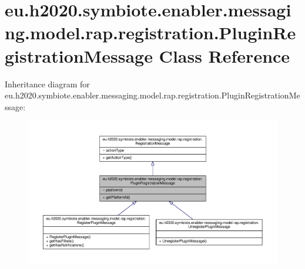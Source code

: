 \hypertarget{classeu_1_1h2020_1_1symbiote_1_1enabler_1_1messaging_1_1model_1_1rap_1_1registration_1_1PluginRegistrationMessage}{}\section{eu.\+h2020.\+symbiote.\+enabler.\+messaging.\+model.\+rap.\+registration.\+Plugin\+Registration\+Message Class Reference}
\label{classeu_1_1h2020_1_1symbiote_1_1enabler_1_1messaging_1_1model_1_1rap_1_1registration_1_1PluginRegistrationMessage}


Inheritance diagram for eu.\+h2020.\+symbiote.\+enabler.\+messaging.\+model.\+rap.\+registration.\+Plugin\+Registration\+Message\+:
\nopagebreak
\begin{figure}[H]
\begin{center}
\leavevmode
\includegraphics[width=350pt]{classeu_1_1h2020_1_1symbiote_1_1enabler_1_1messaging_1_1model_1_1rap_1_1registration_1_1PluginRe00326a9312c42a001ca3934193fff49a}
\end{center}
\end{figure}


